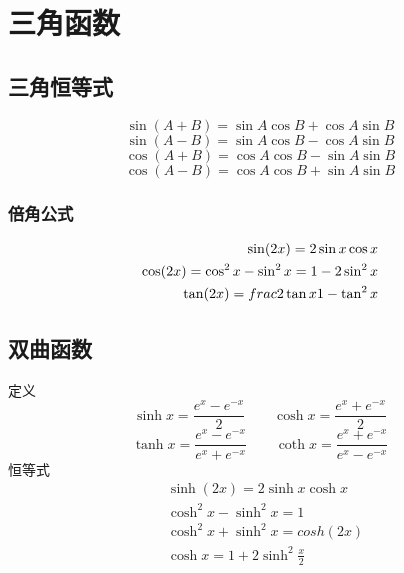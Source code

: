 \section{三角函数}
\subsection{三角恒等式}
$$\sin(A+B)= \sin A\cos B+\cos A\sin B$$
$$\sin(A-B)= \sin A\cos B-\cos A\sin B$$
$$\cos(A+B)= \cos A\cos B-\sin A\sin B$$
$$\cos(A-B)= \cos A\cos B+\sin A\sin B$$
\subsubsection{倍角公式}
\begin{displaymath}
    \centering
    \begin{split}
        \sin(2x)=2\sin x\cos x\\
        \cos(2x)=\cos^2x-\sin^2x=1-2\sin^2 x\\
        \tan(2x)=frac{2\tan x}{1-\tan^2x}
    \end{split}
\end{displaymath}
\subsection{双曲函数}
定义
$$\sinh x = \frac{e^x-e^{-x}}{2}\qquad \cosh x = \frac{e^x+e^{-x}}{2}$$
$$\tanh x = \frac{e^x-e^{-x}}{e^x+e^{-x}}\qquad \coth x = \frac{e^x+e^{-x}}{e^x-e^{-x}}$$
恒等式
\begin{align}
&\sinh (2x) = 2\sinh x\cosh x \label{eq:hyperbolic_functions_1} \\
&\cosh^2x-\sinh^2x = 1 \label{eq:hyperbolic_functions_2} \\
&\cosh^2x+\sinh^2x = cosh (2x) \label{eq:hyperbolic_functions_3} \\
&\cosh x = 1+2\sinh^2\frac{x}{2} \label{eq:hyperbolic_functions_4}
\end{align}
